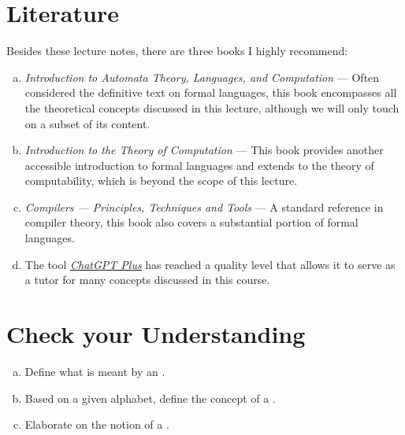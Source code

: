 \section{Literature}
Besides these lecture notes, there are three books I highly recommend:
\begin{enumerate}[(a)]
\item \emph{Introduction to Automata Theory, Languages, and Computation} \cite{hopcroft:06}
      --- Often considered   the definitive text on formal languages, this book encompasses all the theoretical
      concepts discussed in this lecture, although we will only touch on a subset of its content. 
\item \emph{Introduction to the Theory of Computation} \cite{sipser:2012}
      --- This book provides another accessible introduction to formal languages and extends to the theory of
      computability, which is beyond the scope of this lecture. 
\item \emph{Compilers --- Principles, Techniques and Tools} \cite{aho:2006}
      --- A standard reference in compiler theory, this book also covers a substantial portion of formal languages.
\item The tool \href{https://openai.com/blog/chatgpt-plus}{\emph{ChatGPT Plus}} has reached a quality level
      that allows it to serve as a tutor for many concepts discussed in this course.
\end{enumerate}

\section{Check your Understanding}
\begin{enumerate}[(a)]
\item Define what is meant by an .
\item Based on a given alphabet, define the concept of a .
\item Elaborate on the notion of a .
\end{enumerate}


